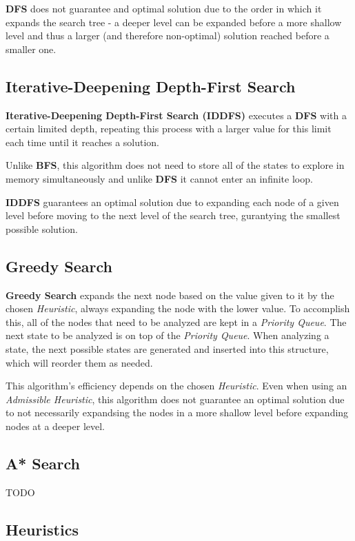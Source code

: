\documentclass[conference]{IEEEtran}
\begin{document}
\textbf{DFS} does not guarantee and optimal solution due to the order in which it expands the search tree - a deeper level can be expanded before a more shallow level and thus a larger (and therefore non-optimal) solution reached before a smaller one.

\subsection{Iterative-Deepening Depth-First Search}

\textbf{Iterative-Deepening Depth-First Search (IDDFS)} executes a \textbf{DFS} with a certain limited depth, repeating this process with a larger value for this limit each time until it reaches a solution.

Unlike \textbf{BFS}, this algorithm does not need to store all of the states to explore in memory simultaneously and unlike \textbf{DFS} it cannot enter an infinite loop.

\textbf{IDDFS} guarantees an optimal solution due to expanding each node of a given level before moving to the next level of the search tree, gurantying the smallest possible solution.

\subsection{Greedy Search}

\textbf{Greedy Search} expands the next node based on the value given to it by the chosen \textit{Heuristic}, always expanding the node with the lower value. To accomplish this, all of the nodes that need to be analyzed are kept in a \textit{Priority Queue}. The next state to be analyzed is on top of the \textit{Priority Queue}. When analyzing a state, the next possible states are generated and inserted into this structure, which will reorder them as needed.

This algorithm's efficiency depends on the chosen \textit{Heuristic}. Even when using an \textit{Admissible Heuristic}, this algorithm does not guarantee an optimal solution due to not necessarily expandsing the nodes in a more shallow level before expanding nodes at a deeper level.

\subsection{A* Search}

TODO

\subsection{Heuristics}
\end{document}
